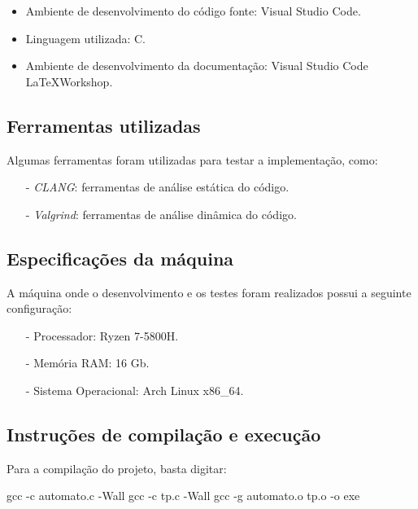 \documentclass{article}
\begin{document}
\begin{itemize}
  \item Ambiente de desenvolvimento do código fonte: Visual Studio Code.
  \item Linguagem utilizada: C.
  \item Ambiente de desenvolvimento da documentação: Visual Studio Code \LaTeX Workshop.
\end{itemize}

\subsection{Ferramentas utilizadas}
Algumas ferramentas foram utilizadas para testar a implementação, como:

\begin{itemize}
    \item[-] \textit{CLANG}: ferramentas de análise estática do código.
    \item[-] \textit{Valgrind}: ferramentas de análise dinâmica do código.
\end{itemize}

\subsection{Especificações da máquina}
A máquina onde o desenvolvimento e os testes foram realizados possui a seguinte configuração:

\begin{itemize}
    \item[-] Processador: Ryzen 7-5800H.
    \item[-] Memória RAM: 16 Gb.
    \item[-] Sistema Operacional: Arch Linux x86\_64.
\end{itemize}


\subsection{Instruções de compilação e execução}

Para a compilação do projeto, basta digitar:

\begin{tcolorbox}[title=Compilando o projeto,width=\linewidth]
    gcc -c automato.c -Wall \newline
    gcc -c tp.c -Wall \newline
    gcc  -g automato.o tp.o -o exe
\end{tcolorbox}
\end{document}
